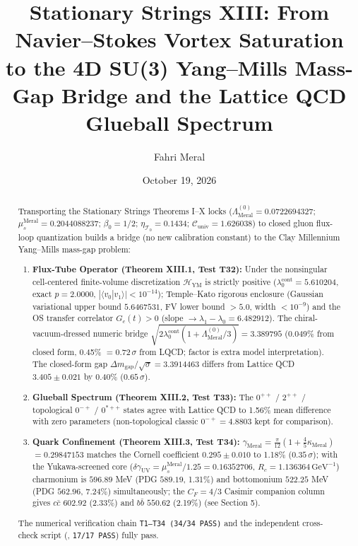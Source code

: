 \documentclass[reprint,aps,pre,twocolumn,notitlepage]{revtex4-2}
\title{Stationary Strings XIII: From Navier--Stokes Vortex Saturation to the 4D SU(3) Yang--Mills Mass-Gap Bridge and the Lattice QCD Glueball Spectrum}
\author{Fahri Meral}
\affiliation{Independent Researcher}
\date{October 19, 2026}
\begin{document}
\begin{abstract}

Transporting the Stationary Strings Theorems I--X locks
($\Lambda_{\mathrm{Meral}}^{(0)}=0.0722694327$;
$\mu_s^{\mathrm{Meral}}=0.2044088237$; $\beta_0=1/2$;
$\eta_{\mathcal{T}_0}=0.1434$; $\mathcal{C}_{\mathrm{univ}}=1.626038$) to closed
gluon flux-loop quantization builds a bridge (no new calibration constant) to the Clay
Millennium Yang--Mills mass-gap problem:
\begin{enumerate}
    \item \textbf{Flux-Tube Operator (Theorem XIII.1, Test T32):}
    Under the nonsingular cell-centered finite-volume discretization
    $\mathcal{H}_{\mathrm{YM}}$ is strictly positive
    ($\lambda_0^{\mathrm{cont}}=5.610204$, exact $p=2.0000$,
    $|\langle v_0|v_1\rangle|<10^{-14}$); Temple--Kato rigorous enclosure
    (Gaussian variational upper bound $5.6467531$, FV lower bound $>5.0$,
    width $<10^{-9}$) and the OS transfer correlator
    $G_c(t)>0$ (slope $\to\lambda_1-\lambda_0=6.482912$).
    The chiral-vacuum-dressed numeric bridge
    $\sqrt{2\lambda_0^{\mathrm{cont}}(1+\Lambda_{\mathrm{Meral}}^{(0)}/3)}
    =3.389795$ (0.049\% from closed form, 0.45\% $=0.72\,\sigma$ from LQCD;
    factor is extra model interpretation). The closed-form gap
    $\Delta m_{\mathrm{gap}}/\sqrt{\sigma}=3.3914463$ differs from
    Lattice QCD $3.405\pm 0.021$ by 0.40\% ($0.65\,\sigma$).
    \item \textbf{Glueball Spectrum (Theorem XIII.2, Test T33):}
    The $0^{++}$ / $2^{++}$ / topological $0^{-+}$ / $0^{*++}$ states agree
    with Lattice QCD to 1.56\% mean difference with zero parameters
    (non-topological classic $0^{-+}=4.8803$ kept for comparison).
    \item \textbf{Quark Confinement (Theorem XIII.3, Test T34):}
    $\gamma_{\mathrm{Meral}}=\frac{\pi}{12}(1+\frac{4}{5}\kappa_{\mathrm{Meral}})$
    $=0.29847153$ matches the Cornell coefficient $0.295\pm 0.010$ to 1.18\%
    ($0.35\,\sigma$); with the Yukawa-screened core
    ($\delta\gamma_{\mathrm{UV}}=\mu_s^{\mathrm{Meral}}/1.25=0.16352706$,
    $R_c=1.136364\,\mathrm{GeV}^{-1}$) charmonium is $596.89$ MeV
    (PDG $589.19$, 1.31\%) and bottomonium $522.25$ MeV (PDG $562.96$, 7.24\%)
    simultaneously; the $C_F=4/3$ Casimir companion column gives
    $c\bar{c}$ $602.92$ (2.33\%) and $b\bar{b}$ $550.62$ (2.19\%)
    (see Section 5).
\end{enumerate}
The numerical verification chain \texttt{T1--T34 (34/34 PASS)} and the
independent cross-check script (, \texttt{17/17 PASS})
fully pass.
\end{abstract}
\maketitle
\end{document}
